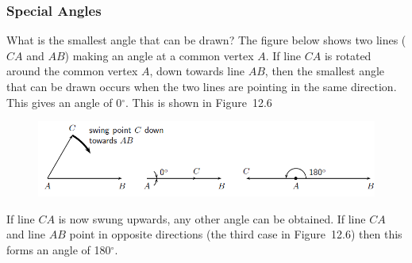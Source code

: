             \subsubsection{ Special Angles}
            \nopagebreak
        \label{m39370*id314513}What is the smallest angle that can be drawn? The figure below shows two lines (\begin{math}CA\end{math} and \begin{math}AB\end{math}) making an angle at a common vertex \begin{math}A\end{math}. If line \begin{math}CA\end{math} is rotated around the common vertex \begin{math}A\end{math}, down towards line \begin{math}AB\end{math}, then the smallest angle that can be drawn occurs when the two lines are pointing in the same direction. This gives an angle of 0\begin{math}{}^{\circ }\end{math}. This is shown in Figure~12.6\par 
        \label{m39370*id314590}
    \setcounter{subfigure}{0}
	\begin{figure}[H] %
    \begin{center}
    \label{m39370*id314593!!!underscore!!!media}\label{m39370*id314593!!!underscore!!!printimage}\includegraphics[width=.8\columnwidth]{col11306.imgs/m39370_MG10C13_006.png} %
      \vspace{2pt}
    \vspace{.1in}
    \end{center}
 \end{figure}       
        \par 
        \label{m39370*id314599}If line \begin{math}CA\end{math} is now swung upwards, any other angle can be obtained. If line \begin{math}CA\end{math} and line \begin{math}AB\end{math} point in opposite directions (the third case in Figure~12.6) then this forms an angle of 180\begin{math}{}^{\circ }\end{math}.\par 
